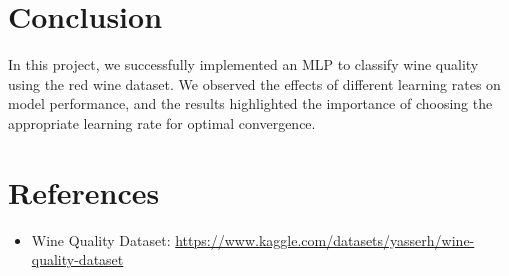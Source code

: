 \documentclass[12pt]{article}
\begin{document}
\section{Conclusion}
In this project, we successfully implemented an MLP to classify wine quality using the red wine dataset. We observed the effects of different learning rates on model performance, and the results highlighted the importance of choosing the appropriate learning rate for optimal convergence.

\section{References}
\begin{itemize}
    \item Wine Quality Dataset: \url{https://www.kaggle.com/datasets/yasserh/wine-quality-dataset}
\end{itemize}
\end{document}
